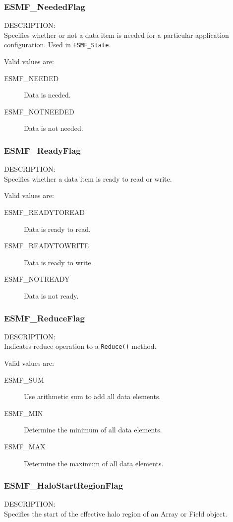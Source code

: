 \subsubsection{ESMF\_NeededFlag}
\label{opt:neededflag}
{\sf DESCRIPTION:\\}
Specifies whether or not a data item is needed for a 
particular application configuration.  Used in {\tt ESMF\_State}.

Valid values are:
\begin{description}
   \item [ESMF\_NEEDED] 
         Data is needed.
   \item [ESMF\_NOTNEEDED]
         Data is not needed.
\end{description}

\subsubsection{ESMF\_ReadyFlag}
\label{opt:readyflag}
{\sf DESCRIPTION:\\}
Specifies whether a data item is ready to read or write.

Valid values are:
\begin{description}
   \item [ESMF\_READYTOREAD] 
         Data is ready to read.
   \item [ESMF\_READYTOWRITE]
         Data is ready to write.
   \item [ESMF\_NOTREADY]
         Data is not ready.
\end{description}

\subsubsection{ESMF\_ReduceFlag}
\label{opt:reduceflag}
{\sf DESCRIPTION:\\}
Indicates reduce operation to a {\tt Reduce()} method.

Valid values are:
\begin{description}
   \item [ESMF\_SUM]
         Use arithmetic sum to add all data elements.
   \item [ESMF\_MIN]
         Determine the minimum of all data elements.
   \item [ESMF\_MAX]
         Determine the maximum of all data elements.
\end{description}

\subsubsection{ESMF\_HaloStartRegionFlag}
\label{opt:halostartregionflag}
{\sf DESCRIPTION:\\}
Specifies the start of the effective halo region of an Array or Field object.

